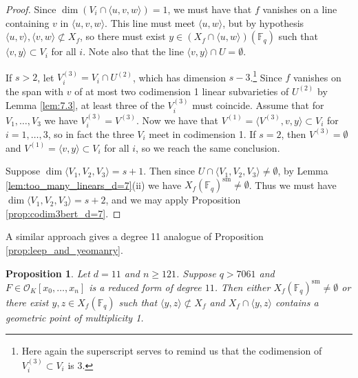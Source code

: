 \documentclass{amsart}
\newcommand{\F}{\mathbb{F}}
\renewcommand{\O}{\mathcal{O}}
\newcommand{\Span}[1]{\langle #1 \rangle}
\newcommand{\sm}{\mathrm{sm}}
\newtheorem{proposition}[theorem]{Proposition}
\theoremstyle{definition}
\numberwithin{equation}{section}
\numberwithin{table}{section}
\newcommand{\qbound}[1]{{\color{cyan}$q > {#1}$}}
\renewcommand{\qbound}[1]{{$q > {#1}$}}
\begin{document}
\begin{proof}
    Since $\dim (V_i \cap \Span{u,v,w}) =1$, we must have that $f$ vanishes on a line containing $v$ in $\Span{u,v,w}$. This line must meet $\Span{u,w}$, but by hypothesis $\Span{u,v}, \Span{v,w} \not\subset X_f$, so there must exist $y \in (X_f \cap \Span{u,w})(\F_q)$ such that $\Span{v,y} \subset V_i$ for all $i$. Note also that the line $\Span{v,y} \cap U = \emptyset$. 

    If $s > 2$, let $V_i^{(3)} = V_i \cap U^{(2)}$, which has dimension $s-3$.\footnote{Here again the superscript serves to remind us that the codimension of $V_i^{(3)} \subset V_i$ is 3.} Since $f$ vanishes on the span with $v$ of at most two codimension 1 linear subvarieties of $U^{(2)}$ by Lemma \ref{lem:7.3}, at least three of the $V_i^{(3)}$ must coincide. Assume that for $V_1, \ldots, V_3$ we have $V_i^{(3)} = V^{(3)}$. Now we have that $V^{(1)} = \Span{V^{(3)}, v, y} \subset V_i$ for $i=1, \ldots, 3$, so in fact the three $V_i$ meet in codimension 1. If $s=2$, then $V^{(3)} = \emptyset$ and $V^{(1)} = \Span{v,y} \subset V_i$ for all $i$, so we reach the same conclusion.

    Suppose $\dim \Span{V_1,V_2, V_3} = s+1$. Then since $U \cap \Span{V_1,V_2,V_3} \neq \emptyset$, by Lemma \ref{lem:too_many_linears_d=7}(ii) we have $X_f(\F_q)^\sm \neq \emptyset$. Thus we must have $\dim\Span{V_1,V_2,V_3} = s+2$, and we may apply Proposition \ref{prop:codim3bert_d=7}.
\end{proof}

A similar approach gives a degree 11 analogue of Proposition \ref{prop:leep_and_yeomanry}. 

\begin{proposition}
\label{prop:leep_and_yeomanry_d=11}
	Let $d = 11$ and $n \geq 121$. Suppose \qbound{7061} and $F \in \O_K[x_0, \ldots, x_n]$ is a reduced form of degree $11$. Then either $X_f(\F_q)^{\sm} \neq \emptyset$ or there exist $y,z \in X_f(\F_q)$ such that $\Span{y,z} \not\subset X_f$ and $X_f \cap \Span{y,z}$ contains a geometric point of multiplicity 1.
\end{proposition}
\end{document}
